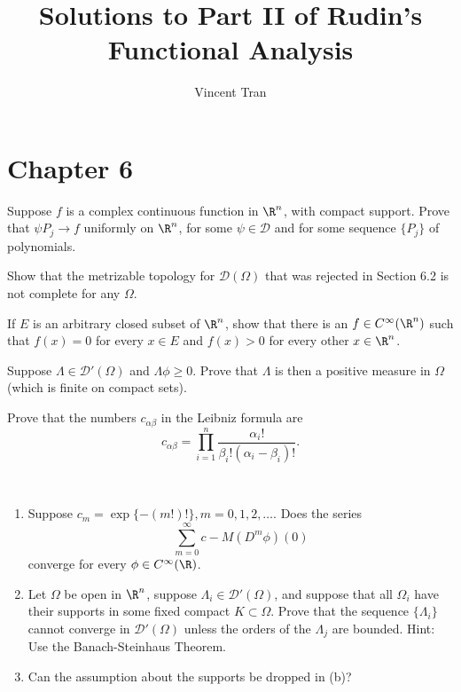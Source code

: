 \documentclass[a4paper]{article}
\title{Solutions to Part II of Rudin's Functional Analysis}
\author{Vincent Tran}
\begin{document}
\maketitle

\section{Chapter 6}

\begin{exercise}
	Suppose $f $ is a complex continuous function in $\R^n $, with compact support. Prove that $\psi P_j \to f $ uniformly on $\R^n $, for some $\psi \in \mathscr{D} $ and for some sequence $\{P_j\}   $ of polynomials.
\end{exercise}

\begin{exercise}
	Show that the metrizable topology for $\mathscr{D}(\Omega) $ that was rejected in Section 6.2 is not complete for any $\Omega $.
\end{exercise}

\begin{execrise}
	If $E $ is an arbitrary closed subset of $\R^n $, show that there is an $f \in C^\infty(\R^n) $ such that $f(x) = 0 $ for every $x \in E $ and $f(x) > 0 $ for every other $x\in \R^n $.
\end{execrise}

\begin{exercise}
	Suppose $\Lambda \in \mathscr{D}'(\Omega) $ and $\Lambda \phi  \ge 0 $. Prove that $\Lambda $ is then a positive measure in $\Omega $ (which is finite on compact sets).
\end{exercise}

\begin{exercise}
	Prove that the numbers $c_{\alpha \beta} $ in the Leibniz formula are
	\[
		c_{\alpha \beta} = \prod_{i=1}^n \frac{\alpha_i!}{\beta_i! (\alpha_i - \beta_i)!}
	.\] 
\end{exercise}

\begin{exercise}
	~
	\begin{enumerate}
		\item Suppose $c_m = \exp \{-(m!)!\} , m = 0,1,2,\ldots  $. Does the series
			\[
				\sum_{m=0}^{\infty} c-M(D^m \phi )(0)
			\] 
			converge for every $\phi \in C^\infty(\R) $.
		\item Let $\Omega $ be open in $\R^n $, suppose $\Lambda_i \in \mathscr{D}'(\Omega) $, and suppose that all $\Omega_i $ have their supports in some fixed compact $K \subset \Omega $. Prove that the sequence $\{\Lambda_i\}   $ cannot converge in $\mathscr{D}'(\Omega) $ unless the orders of the $\Lambda_j $ are bounded.
			\ifhint
				Hint: Use the Banach-Steinhaus Theorem.
			\fi
		\item Can the assumption about the supports be dropped in (b)?
	\end{enumerate}
\end{exercise}
\end{document}
